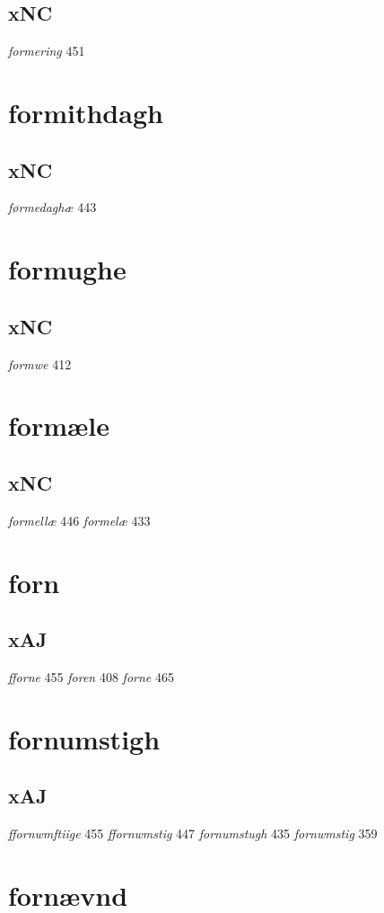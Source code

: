 \documentclass[a4paper,twocolumn]{article}
\begin{document}
\subsection{xNC}
\label{sec:org26ffa89}
\emph{formering} 451 
\section{formithdagh}
\label{sec:org3a38428}
\subsection{xNC}
\label{sec:orgef9e04c}
\emph{førmedaghæ} 443 
\section{formughe}
\label{sec:orga6bbf97}
\subsection{xNC}
\label{sec:org06e427f}
\emph{formwe} 412 
\section{formæle}
\label{sec:org5e9b79e}
\subsection{xNC}
\label{sec:orge0432c9}
\emph{formellæ} 446 \emph{formelæ} 433 
\section{forn}
\label{sec:org8ea90f1}
\subsection{xAJ}
\label{sec:org9b25327}
\emph{fforne} 455 \emph{foren} 408 \emph{forne} 465 
\section{fornumstigh}
\label{sec:org358c6fb}
\subsection{xAJ}
\label{sec:org0f4d5a7}
\emph{ffornwmftiige} 455 \emph{ffornwmstig} 447 \emph{fornumstugh} 435 \emph{fornwmstig} 359 
\section{fornævnd}
\label{sec:orgd5a645a}
\end{document}
